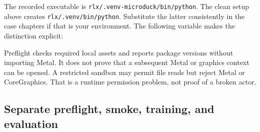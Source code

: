 \documentclass[
  american,
  11pt,
  letterpaper,
]{article}
\newenvironment{Shaded}{\begin{snugshade}}{\end{snugshade}}
\newcommand{\AttributeTok}[1]{\textcolor[rgb]{0.13,0.29,0.53}{#1}}
\newcommand{\BuiltInTok}[1]{#1}
\newcommand{\NormalTok}[1]{#1}
\newcommand{\OperatorTok}[1]{\textcolor[rgb]{0.81,0.36,0.00}{\textbf{#1}}}
\newcommand{\StringTok}[1]{\textcolor[rgb]{0.31,0.60,0.02}{#1}}
\newcommand{\VariableTok}[1]{\textcolor[rgb]{0.00,0.00,0.00}{#1}}
\renewenvironment{Shaded}{\par\smallskip}{\par\smallskip}
\begin{document}
The recorded executable is
\texttt{rlx/\allowbreak{}.venv-\allowbreak{}microduc\allowbreak{}k/\allowbreak{}bin/\allowbreak{}python}.
The clean setup above creates
\texttt{rlx/\allowbreak{}.venv/\allowbreak{}bin/\allowbreak{}python}.
Substitute the latter consistently in the case chapters if that is your
environment. The following variable makes the distinction explicit:

\begin{Shaded}
\end{Shaded}

Preflight checks required local assets and reports package versions
without importing Metal. It does not prove that a subsequent Metal or
graphics context can be opened. A restricted sandbox may permit file
reads but reject Metal or CoreGraphics. That is a runtime permission
problem, not proof of a broken actor.

\subsection{Separate preflight, smoke, training, and
evaluation}\label{separate-preflight-smoke-training-and-evaluation}
\end{document}
